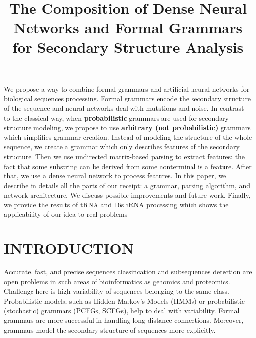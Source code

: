 \documentclass[a4paper,twoside]{article}
\begin{document}
\title{The Composition of Dense Neural Networks and Formal Grammars for Secondary Structure Analysis}

\author{
}


\abstract
{
We propose a way to combine formal grammars and artificial neural networks for biological sequences processing.
Formal grammars encode the secondary structure of the sequence and neural networks deal with mutations and noise.
In contrast to the classical way, when \textbf{probabilistic} grammars are used for secondary structure modeling, we propose to use \textbf{arbitrary (not probabilistic)} grammars which simplifies grammar creation.
Instead of modeling the structure of the whole sequence, we create a grammar which only describes features of the secondary structure.
Then we use undirected matrix-based parsing to extract features: the fact that some substring can be derived from some nonterminal is a feature. 
After that, we use a dense neural network to process features.
In this paper, we describe in details all the parts of our receipt: a grammar, parsing algorithm, and network architecture. We discuss possible improvements and future work.
Finally, we provide the results of tRNA and 16s rRNA processing which shows the applicability of our idea to real problems.
}

\onecolumn \maketitle \normalsize \vfill

\section{\uppercase{Introduction}}
\label{sec:introduction}

\noindent Accurate, fast, and precise sequences classification and subsequences detection are open problems in such areas of bioinformatics as genomics and proteomics. 
Challenge here is high variability of sequences belonging to the same class.
Probabilistic models, such as Hidden Markov's Models (HMMs) or probabilistic (stochastic) grammars (PCFGs, SCFGs), help to deal with variability.
Formal grammars are more successful in handling long-distance connections.
Moreover, grammars model the secondary structure of sequences more explicitly.
\end{document}
